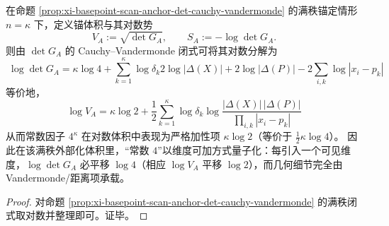 
\begin{corollary}\label{cor:xi-anchor-gram-log4-quantum}
在命题 \ref{prop:xi-basepoint-scan-anchor-det-cauchy-vandermonde} 的满秩锚定情形 \(n=\kappa\) 下，定义锚体积与其对数势
\[
V_A:=\sqrt{\det G_A},\qquad S_A:=-\log\det G_A.
\]
则由 \(\det G_A\) 的 Cauchy--Vandermonde 闭式可将其对数分解为
\[
\boxed{\;
\log\det G_A
=\kappa\log 4+\sum_{k=1}^{\kappa}\log\delta_k
2\log|\Delta(X)|+2\log|\Delta(P)|
-2\sum_{i,k}\log|x_i-p_k|\;}
\]
等价地，
\[
\boxed{\;
\log V_A
=\kappa\log 2+\frac12\sum_{k=1}^{\kappa}\log\delta_k
\log\frac{|\Delta(X)|\,|\Delta(P)|}{\prod_{i,k}|x_i-p_k|}\;}
\]
从而常数因子 \(4^\kappa\) 在对数体积中表现为严格加性项 \(\kappa\log 2\)（等价于 \(\tfrac12\kappa\log 4\)）。
因此在该满秩外部化体积里，“常数 \(4\)”以维度可加方式量子化：每引入一个可见维度，\(\log\det G_A\) 必平移 \(\log 4\)（相应 \(\log V_A\) 平移 \(\log 2\)），而几何细节完全由 Vandermonde/距离项承载。
\end{corollary}
\begin{proof}
对命题 \ref{prop:xi-basepoint-scan-anchor-det-cauchy-vandermonde} 的满秩闭式取对数并整理即可。证毕。
\end{proof}

